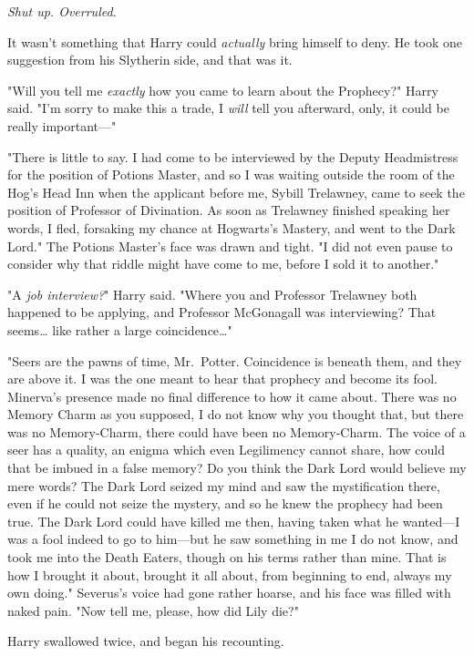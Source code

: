 \emph{Shut up. Overruled.}

It wasn't something that Harry could \emph{actually} bring himself to deny. He
took one suggestion from his Slytherin side, and that was it.

"Will you tell me \emph{exactly} how you came to learn about the Prophecy?"
Harry said. "I'm sorry to make this a trade, I \emph{will} tell you afterward,
only, it could be really important---"

"There is little to say. I had come to be interviewed by the Deputy
Headmistress for the position of Potions Master, and so I was waiting outside
the room of the Hog's Head Inn when the applicant before me, Sybill Trelawney,
came to seek the position of Professor of Divination. As soon as Trelawney
finished speaking her words, I fled, forsaking my chance at Hogwarts's Mastery,
and went to the Dark Lord." The Potions Master's face was drawn and tight. "I
did not even pause to consider why that riddle might have come to me, before I
sold it to another."

"A \emph{job interview?}" Harry said. "Where you and Professor Trelawney both
happened to be applying, and Professor McGonagall was interviewing? That
seems{\ldots} like rather a large coincidence{\ldots}"

"Seers are the pawns of time, Mr.~Potter. Coincidence is beneath them, and they
are above it. I was the one meant to hear that prophecy and become its fool.
Minerva's presence made no final difference to how it came about. There was no
Memory Charm as you supposed, I do not know why you thought that, but there was
no Memory-Charm, there could have been no Memory-Charm. The voice of a seer has
a quality, an enigma which even Legilimency cannot share, how could that be
imbued in a false memory? Do you think the Dark Lord would believe my mere
words? The Dark Lord seized my mind and saw the mystification there, even if he
could not seize the mystery, and so he knew the prophecy had been true. The
Dark Lord could have killed me then, having taken what he wanted---I was a fool
indeed to go to him---but he saw something in me I do not know, and took me
into the Death Eaters, though on his terms rather than mine. That is how I
brought it about, brought it all about, from beginning to end, always my own
doing." Severus's voice had gone rather hoarse, and his face was filled with
naked pain. "Now tell me, please, how did Lily die?"

Harry swallowed twice, and began his recounting.

